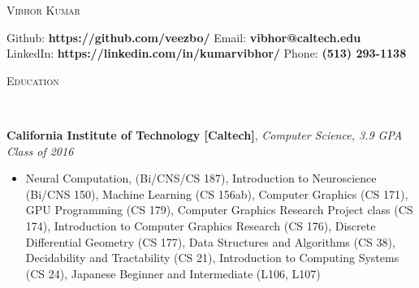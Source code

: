 \documentclass[9pt]{article}
\newenvironment{changemargin}[2]{%
  \begin{list}{}{%
    \setlength{\topsep}{0pt}%
    \setlength{\leftmargin}{#1}%
    \setlength{\rightmargin}{#2}%
    \setlength{\listparindent}{\parindent}%
    \setlength{\itemindent}{\parindent}%
    \setlength{\parsep}{\parskip}%
  }%
  \item[]}{\end{list}
}
\newcommand{\lineover}{
	\begin{changemargin}{-0.05in}{-0.05in}
		\vspace*{-8pt}
		\hrulefill \\
		\vspace*{-2pt}
	\end{changemargin}
}
\newcommand{\header}[1]{
	\begin{changemargin}{-0.5in}{-0.5in}
		\scshape{#1}\\
  	\lineover
	\end{changemargin}
}
\newenvironment{body} {
	\vspace*{-16pt}
	\begin{changemargin}{-0.25in}{-0.5in}
  }	
	{\end{changemargin}
}
\begin{document}
\begin{center} 
	{\Large \scshape Vibhor Kumar} 
\end{center}
	\vspace*{-2pt}
\hspace{-12mm} Github: \hspace{3mm} \textbf{https://github.com/veezbo/}
\hspace{46mm} Email: \hspace{0.1mm} \textbf{vibhor@caltech.edu} \\
\vspace*{1pt}
\hspace{-12mm} LinkedIn: \hspace{0.25mm} \textbf{https://linkedin.com/in/kumarvibhor/} \hspace{26.75mm} Phone: \textbf{(513) 293-1138}\\
\vspace{1pt}
\smallskip
\header{Education}
\begin{body}
	\vspace{15pt}
	\textbf{California Institute of Technology [Caltech]}{}, \emph{Computer Science, 3.9 GPA} \hfill \emph{Class of 2016}{} \\
	\begin{itemize} \itemsep -0pt
	\item Neural Computation, (Bi/CNS/CS 187), Introduction to Neuroscience (Bi/CNS 150), Machine Learning (CS 156ab), Computer Graphics (CS 171), GPU Programming (CS 179), Computer Graphics Research Project class (CS 174), Introduction to Computer Graphics Research (CS 176), Discrete Differential Geometry (CS 177), Data Structures and Algorithms (CS 38), Decidability and Tractability (CS 21), Introduction to Computing Systems (CS 24), Japanese Beginner and Intermediate (L106, L107)
	\end{itemize}
\end{body}

\smallskip
\vspace*{-3pt}
\end{document}
